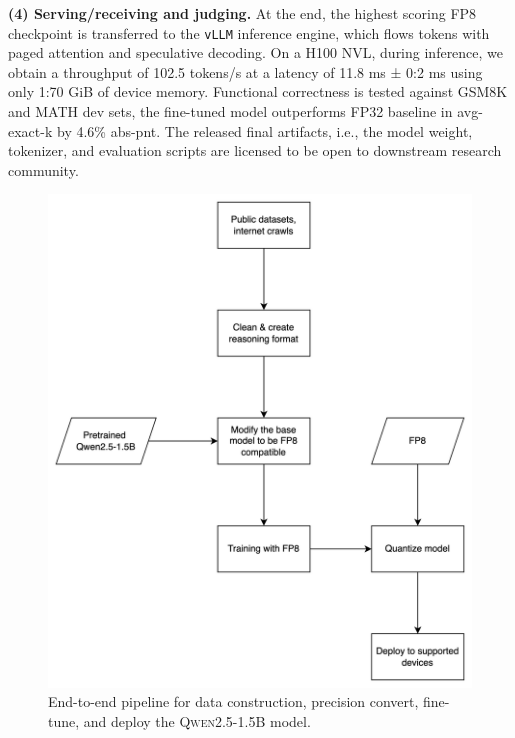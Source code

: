 \textbf{(4) Serving/receiving and judging.}
At the end, the highest scoring FP8 checkpoint is transferred to the \texttt{vLLM} inference engine, which flows tokens with paged attention and speculative decoding. On a H100 NVL, during inference, we obtain a throughput of 102.5 tokens/s at a latency of 11.8 ms ± 0:2 ms using only 1:70 GiB of device memory. Functional correctness is tested against GSM8K and MATH dev sets, the fine-tuned model outperforms FP32 baseline in avg-exact-k by 4.6\% abs-pnt. The released final artifacts, i.e., the model weight, tokenizer, and evaluation scripts are licensed to be open to downstream research community.

    
\begin{figure}[h]
    \centering
    \includegraphics[width=0.75\linewidth]{figures/c1/overview.drawio.png}
    \caption{End-to-end pipeline for data construction, precision convert, fine-tune, and deploy the \textsc{Qwen2.5-1.5B} model.}
    \label{fig:overview}
\end{figure}
